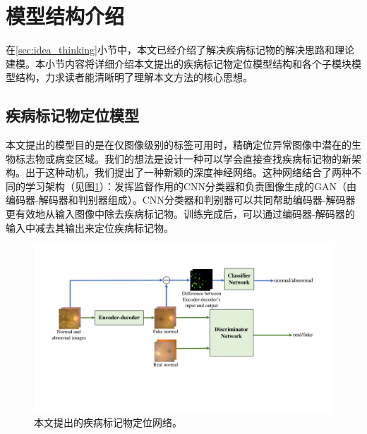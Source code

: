 \section{模型结构介绍}\label{sec:model_architecture_intro}
在\ref{sec:idea_thinking}小节中，本文已经介绍了解决疾病标记物的解决思路和理论建模。本小节内容将详细介绍本文提出的疾病标记物定位模型结构和各个子模块模型结构，力求读者能清晰明了理解本文方法的核心思想。


\subsection{疾病标记物定位模型}\label{subsec:model_architecture}
本文提出的模型目的是在仅图像级别的标签可用时，精确定位异常图像中潜在的生物标志物或病变区域。我们的想法是设计一种可以学会直接查找疾病标记物的新架构。出于这种动机，我们提出了一种新颖的深度神经网络。这种网络结合了两种不同的学习架构（见图\ref{fig:our_model_architecture}）：发挥监督作用的CNN分类器和负责图像生成的GAN（由编码器-解码器和判别器组成）。CNN分类器和判别器可以共同帮助编码器-解码器更有效地从输入图像中除去疾病标记物。训练完成后，可以通过编码器-解码器的输入中减去其输出来定位疾病标记物。
\begin{figure}[h]
	\centering
	\includegraphics[width=1.0\textwidth]{figure/method.pdf}
	\caption[本文提出的疾病标记物定位网络]{本文提出的疾病标记物定位网络。} 
	\label{fig:our_model_architecture}
\end{figure}
